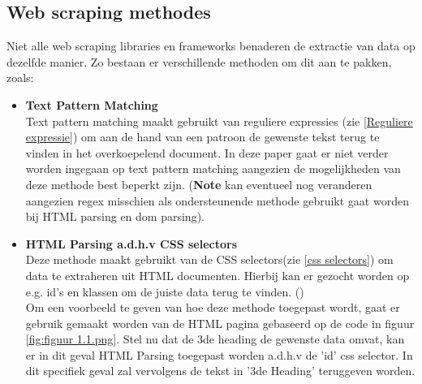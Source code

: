 \subsection{Web scraping methodes}
Niet alle web scraping libraries en frameworks benaderen de extractie van data op dezelfde manier. Zo bestaan er verschillende methoden om dit aan te pakken, zoals:
\begin{itemize}
    \item \textbf{Text Pattern Matching}
\\
Text pattern matching maakt gebruikt van reguliere expressies (zie \ref{Reguliere expressie}) om aan de hand van een patroon de gewenste tekst terug te vinden in het overkoepelend document. In deze paper gaat er niet verder worden ingegaan op text pattern matching aangezien de mogelijkheden van deze methode best beperkt zijn. (\textbf{Note} kan eventueel nog veranderen aangezien regex misschien als ondersteunende methode gebruikt gaat worden bij HTML parsing en dom parsing).
    \item \textbf{HTML Parsing a.d.h.v CSS selectors}
\\
Deze methode maakt gebruikt van de CSS selectors(zie \ref{css selectors}) om data te extraheren uit HTML documenten. Hierbij kan er gezocht worden op e.g. id's en klassen om de juiste data terug te vinden. (\cite{Persson2019})
\\
Om een voorbeeld te geven van hoe deze methode toegepast wordt, gaat er gebruik gemaakt worden van de HTML pagina gebaseerd op de code in figuur \ref{fig:figuur 1.1.png}. Stel nu dat de 3de heading de gewenste data omvat, kan er in dit geval HTML Parsing toegepast worden a.d.h.v de 'id' css selector. In dit specifiek geval zal vervolgens de tekst in '3de Heading' teruggeven worden.
\\


\end{itemize}
